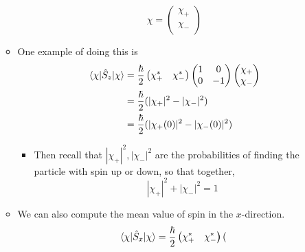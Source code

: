 \documentclass[../notes.tex]{subfiles}
\begin{document}
\begin{itemize}
\begin{itemize}
        \begin{equation*}
            \chi =
            \begin{pmatrix}
                \chi_+\\
                \chi_-\\
            \end{pmatrix}
        \end{equation*}
        \item One example of doing this is
        \begin{align*}
            \ev{\hat{S}_z}{\chi} &= \frac{\hbar}{2}
            \begin{pmatrix}
                \chi_+^* & \chi_-^*\\
            \end{pmatrix}
            \begin{pmatrix}
                1 & 0\\
                0 & -1\\
            \end{pmatrix}
            \begin{pmatrix}
                \chi_+\\
                \chi_-\\
            \end{pmatrix}\\
            &= \frac{\hbar}{2}(|\chi_+|^2-|\chi_-|^2)\\
            &= \frac{\hbar}{2}(|\chi_+(0)|^2-|\chi_-(0)|^2)
        \end{align*}
        \begin{itemize}
            \item Then recall that $|\chi_+|^2,|\chi_-|^2$ are the probabilities of finding the particle with spin up or down, so that together,
            \begin{equation*}
                |\chi_+|^2+|\chi_-|^2 = 1
            \end{equation*}
        \end{itemize}
        \item We can also compute the mean value of spin in the $x$-direction.
        \begin{align*}
            \ev{\hat{S}_x}{\chi} &= \frac{\hbar}{2}
            \begin{pmatrix}
                \chi_+^* & \chi_-^*\\
            \end{pmatrix}
            \begin{pmatrix}

\end{pmatrix}
\end{align*}
\end{itemize}
\end{itemize}
\end{document}
